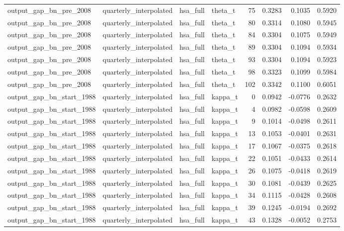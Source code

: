 \begin{tabular}{llllrrrr}
output\_gap\_bn\_pre\_2008 & quarterly\_interpolated & hsa\_full & theta\_t & 75 & 0.3283 & 0.1035 & 0.5920 \\
output\_gap\_bn\_pre\_2008 & quarterly\_interpolated & hsa\_full & theta\_t & 80 & 0.3314 & 0.1080 & 0.5945 \\
output\_gap\_bn\_pre\_2008 & quarterly\_interpolated & hsa\_full & theta\_t & 84 & 0.3304 & 0.1075 & 0.5949 \\
output\_gap\_bn\_pre\_2008 & quarterly\_interpolated & hsa\_full & theta\_t & 89 & 0.3304 & 0.1094 & 0.5934 \\
output\_gap\_bn\_pre\_2008 & quarterly\_interpolated & hsa\_full & theta\_t & 93 & 0.3304 & 0.1094 & 0.5923 \\
output\_gap\_bn\_pre\_2008 & quarterly\_interpolated & hsa\_full & theta\_t & 98 & 0.3323 & 0.1099 & 0.5984 \\
output\_gap\_bn\_pre\_2008 & quarterly\_interpolated & hsa\_full & theta\_t & 102 & 0.3342 & 0.1100 & 0.6051 \\
output\_gap\_bn\_start\_1988 & quarterly\_interpolated & hsa\_full & kappa\_t & 0 & 0.0942 & -0.0776 & 0.2632 \\
output\_gap\_bn\_start\_1988 & quarterly\_interpolated & hsa\_full & kappa\_t & 4 & 0.0982 & -0.0598 & 0.2609 \\
output\_gap\_bn\_start\_1988 & quarterly\_interpolated & hsa\_full & kappa\_t & 9 & 0.1014 & -0.0498 & 0.2611 \\
output\_gap\_bn\_start\_1988 & quarterly\_interpolated & hsa\_full & kappa\_t & 13 & 0.1053 & -0.0401 & 0.2631 \\
output\_gap\_bn\_start\_1988 & quarterly\_interpolated & hsa\_full & kappa\_t & 17 & 0.1067 & -0.0375 & 0.2618 \\
output\_gap\_bn\_start\_1988 & quarterly\_interpolated & hsa\_full & kappa\_t & 22 & 0.1051 & -0.0433 & 0.2614 \\
output\_gap\_bn\_start\_1988 & quarterly\_interpolated & hsa\_full & kappa\_t & 26 & 0.1075 & -0.0418 & 0.2619 \\
output\_gap\_bn\_start\_1988 & quarterly\_interpolated & hsa\_full & kappa\_t & 30 & 0.1081 & -0.0439 & 0.2625 \\
output\_gap\_bn\_start\_1988 & quarterly\_interpolated & hsa\_full & kappa\_t & 34 & 0.1115 & -0.0428 & 0.2608 \\
output\_gap\_bn\_start\_1988 & quarterly\_interpolated & hsa\_full & kappa\_t & 39 & 0.1245 & -0.0194 & 0.2692 \\
output\_gap\_bn\_start\_1988 & quarterly\_interpolated & hsa\_full & kappa\_t & 43 & 0.1328 & -0.0052 & 0.2753 \\

\end{tabular}
